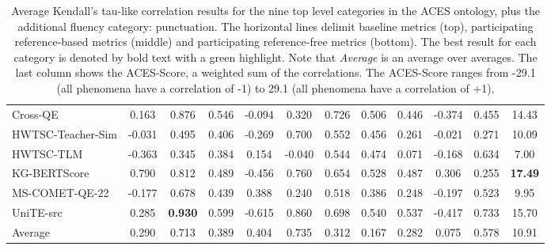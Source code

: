 \documentclass[11pt]{article}
\begin{document}
\begin{sidewaystable*}[ht]
\begin{tabular}{@{}lccccccccccc@{}}
Cross-QE                & \phantom{-}0.163    & \phantom{-}0.876    & \phantom{-}0.546          & -0.094       & \phantom{-}0.320            & \phantom{-}0.726           & \phantom{-}0.506            & \phantom{-}0.446                & -0.374         & \phantom{-}0.455       & 14.43      \\
HWTSC-Teacher-Sim       & -0.031   & \phantom{-}0.495    & \phantom{-}0.406          & -0.269       & \phantom{-}0.700            & \phantom{-}0.552           & \phantom{-}0.456            & \phantom{-}0.261                & -0.021         & \phantom{-}0.271       & 10.09      \\
HWTSC-TLM               & -0.363   & \phantom{-}0.345    & \phantom{-}0.384          & \phantom{-}0.154        & -0.040           & \phantom{-}0.544           & \phantom{-}0.474            & \phantom{-}0.071                & -0.168         & \phantom{-}0.634       & \phantom{1}7.00       \\
KG-BERTScore            & \phantom{-}0.790    & \phantom{-}0.812    & \phantom{-}0.489          & -0.456       & \phantom{-}0.760            & \phantom{-}0.654           & \phantom{-}0.528            & \phantom{-}0.487                & \phantom{-}0.306          & \phantom{-}0.255       & \colorbox[HTML]{B2EAB1}{\textbf{17.49}}      \\
MS-COMET-QE-22          & -0.177   & \phantom{-}0.678    & \phantom{-}0.439          & \phantom{-}0.388        & \phantom{-}0.240            & \phantom{-}0.518           & \phantom{-}0.386            & \phantom{-}0.248                & -0.197         & \phantom{-}0.523       & \phantom{1}9.95       \\
UniTE-src               & \phantom{-}0.285    & \colorbox[HTML]{B2EAB1}{\textbf{\phantom{-}0.930}}    & \phantom{-}0.599          & -0.615       & \phantom{-}0.860            & \phantom{-}0.698           & \phantom{-}0.540            & \phantom{-}0.537                & -0.417         & \phantom{-}0.733       & 15.70      \\
\midrule
Average                 & \phantom{-}0.290    & \phantom{-}0.713    & \phantom{-}0.389          & \phantom{-}0.404        & \phantom{-}0.735            & \phantom{-}0.312           & \phantom{-}0.167            & \phantom{-}0.282                & \phantom{-}0.075          & \phantom{-}0.578       & 10.91  \\   
\bottomrule
\end{tabular}
\caption{Average Kendall’s tau-like correlation results for the nine top level categories in the \textsc{ACES} ontology, plus the additional fluency category: punctuation.  The horizontal lines delimit baseline metrics (top), participating reference-based metrics (middle) and participating reference-free metrics (bottom). The best result for each category is denoted by bold text with a green highlight. Note that \textit{Average} is an average over averages. The last column shows the \textsc{ACES}-Score, a weighted sum of the correlations. The \textsc{ACES}-Score ranges from -29.1 (all phenomena have a correlation of -1) to 29.1 (all phenomena have a correlation of +1).}
\label{tab:analysis_overview}
\end{sidewaystable*}
\afterpage{\clearpage} 
\end{document}
